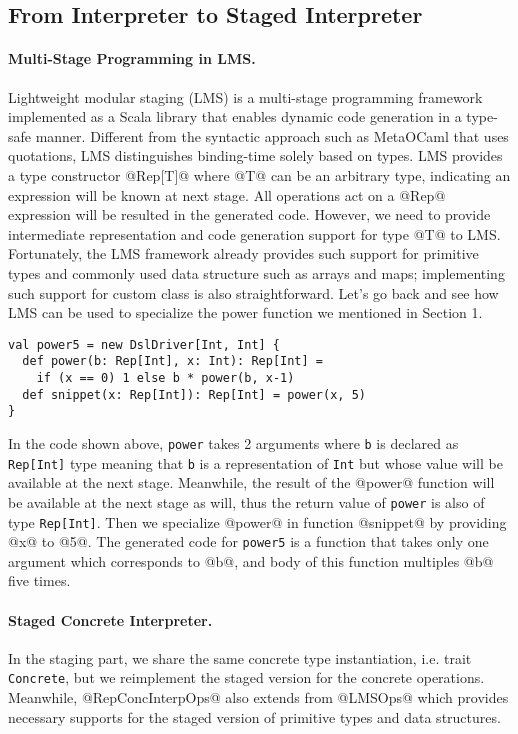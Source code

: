 \subsection{From Interpreter to Staged Interpreter} \label{stagedinterp}

\paragraph{Multi-Stage Programming in LMS.}
Lightweight modular staging (LMS) \cite{DBLP:conf/gpce/RompfO10} is a multi-stage programming framework implemented 
as a Scala library that enables dynamic code generation in a type-safe manner.
Different from the syntactic approach such as MetaOCaml \cite{DBLP:conf/flops/Kiselyov14} that uses quotations, 
LMS distinguishes binding-time solely based on types.
LMS provides a type constructor @Rep[T]@ where @T@ can be an arbitrary type, indicating an expression will be 
known at next stage. All operations act on a @Rep@ expression will be resulted in the generated code. However,
we need to provide intermediate representation and code generation support for type @T@ to LMS. 
Fortunately, the LMS framework already provides
such support for primitive types and commonly used data structure such as arrays and maps; implementing such support
for custom class is also straightforward. Let's go back and see how LMS can be used to specialize the power function
we mentioned in Section 1.

\begin{lstlisting}
val power5 = new DslDriver[Int, Int] {
  def power(b: Rep[Int], x: Int): Rep[Int] =
    if (x == 0) 1 else b * power(b, x-1)
  def snippet(x: Rep[Int]): Rep[Int] = power(x, 5)
}
\end{lstlisting}

In the code shown above, \texttt{power} takes 2 arguments where \texttt{b} is declared as \texttt{Rep[Int]} type 
meaning that \texttt{b} is a representation of \texttt{Int} but whose value will be available at the next stage. 
Meanwhile, the result of the @power@ function will be available at the next stage as will, thus the return value 
of \texttt{power} is also of type \texttt{Rep[Int]}. 
Then we specialize @power@ in function @snippet@ by providing @x@ to @5@.
The generated code for \texttt{power5} is a function that takes only one argument which corresponds to @b@,
and body of this function multiples @b@ five times.

\paragraph{Staged Concrete Interpreter.} In the staging part, we share the same concrete type instantiation, 
i.e. trait \texttt{Concrete}, but we reimplement the staged version for the concrete operations.
Meanwhile, @RepConcInterpOps@ also extends from @LMSOps@ which provides necessary supports for the 
staged version of primitive types and data structures.

